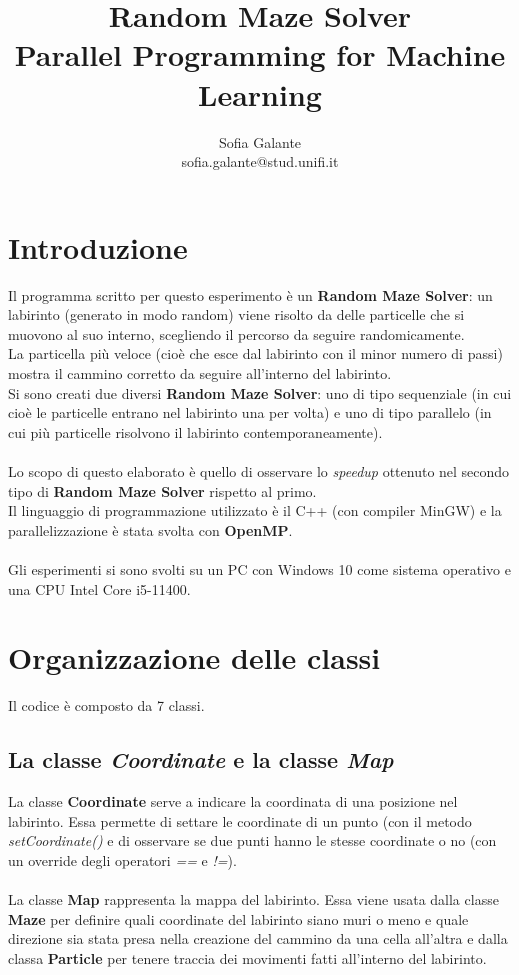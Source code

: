 \documentclass[10pt,twocolumn,letterpaper]{article}
\begin{document}
\title{Random Maze Solver\\
\large Parallel Programming for Machine Learning}

\author{Sofia Galante\\
\small sofia.galante@stud.unifi.it\\
}
\date{}
\maketitle
\thispagestyle{empty}

\section{Introduzione}

Il programma scritto per questo esperimento è un \textbf{Random Maze Solver}: un labirinto (generato in modo random) viene risolto da delle particelle che si muovono al suo interno, scegliendo il percorso da seguire randomicamente.\\
La particella più veloce (cioè che esce dal labirinto con il minor numero di passi) mostra il cammino corretto da seguire all'interno del labirinto.\\
Si sono creati due diversi \textbf{Random Maze Solver}: uno di tipo sequenziale (in cui cioè le particelle entrano nel labirinto una per volta) e uno di tipo parallelo (in cui più particelle risolvono il labirinto contemporaneamente).\\
\\
Lo scopo di questo elaborato è quello di osservare lo \textit{speedup} ottenuto nel secondo tipo di \textbf{Random Maze Solver} rispetto al primo.\\
Il linguaggio di programmazione utilizzato è il C++ (con compiler MinGW) e la parallelizzazione è stata svolta con \textbf{OpenMP}.\\
\\
Gli esperimenti si sono svolti su un PC con Windows 10 come sistema operativo e una CPU Intel Core i5-11400.

\section{Organizzazione delle classi}
Il codice è composto da 7 classi.

\subsection{La classe \textit{Coordinate} e la classe \textit{Map}}
La classe \textbf{Coordinate} serve a indicare la coordinata di una posizione nel labirinto. Essa permette di settare le coordinate di un punto (con il metodo \textit{setCoordinate()} e di osservare se due punti hanno le stesse coordinate o no (con un override degli operatori \textit{==} e \textit{!=}).\\
\\
La classe \textbf{Map} rappresenta la mappa del labirinto. Essa viene usata dalla classe \textbf{Maze} per definire quali coordinate del labirinto siano muri o meno e quale direzione sia stata presa nella creazione del cammino da una cella all'altra e dalla classa \textbf{Particle} per tenere traccia dei movimenti fatti all'interno del labirinto.
\end{document}
